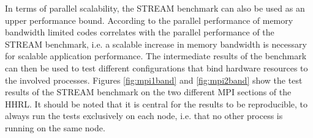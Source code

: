 In terms of parallel scalability, the STREAM benchmark can also be used as an upper performance bound. According to \cite{petsc-web-page} the parallel performance of memory bandwidth limited codes correlates with the parallel performance of the STREAM benchmark, i.e. a scalable increase in memory bandwidth is necessary for scalable application performance. The intermediate results of the benchmark can then be used to test different configurations that bind hardware resources to the involved processes. Figures \ref{fig:mpi1band} and \ref{fig:mpi2band} show the test results of the STREAM benchmark on the two different MPI sections of the HHRL. It should be noted that it is central for the results to be reproducible, to always run the tests exclusively on each node, i.e. that no other process is running on the same node. %


%    
%
%    
%
%
%    

